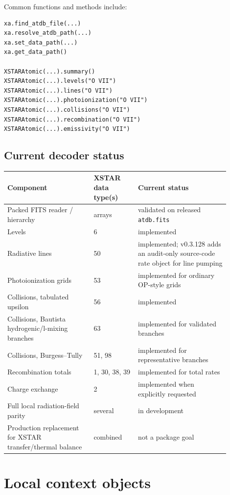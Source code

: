 \documentclass[11pt]{article}
\begin{document}
Common functions and methods include:

\begin{lstlisting}[style=ctpython]
xa.find_atdb_file(...)
xa.resolve_atdb_path(...)
xa.set_data_path(...)
xa.get_data_path()

XSTARAtomic(...).summary()
XSTARAtomic(...).levels("O VII")
XSTARAtomic(...).lines("O VII")
XSTARAtomic(...).photoionization("O VII")
XSTARAtomic(...).collisions("O VII")
XSTARAtomic(...).recombination("O VII")
XSTARAtomic(...).emissivity("O VII")
\end{lstlisting}

\subsection{Current decoder status}

\begin{longtable}{p{0.35\linewidth}p{0.18\linewidth}p{0.37\linewidth}}
\toprule
Component & XSTAR data type(s) & Current status \\
\midrule
Packed FITS reader / hierarchy & arrays & validated on released \texttt{atdb.fits} \\
Levels & 6 & implemented \\
Radiative lines & 50 & implemented; v0.3.128 adds an audit-only source-code rate object for line pumping \\
Photoionization grids & 53 & implemented for ordinary OP-style grids \\
Collisions, tabulated upsilon & 56 & implemented \\
Collisions, Bautista hydrogenic/l-mixing branches & 63 & implemented for validated branches \\
Collisions, Burgess--Tully & 51, 98 & implemented for representative branches \\
Recombination totals & 1, 30, 38, 39 & implemented for total rates \\
Charge exchange & 2 & implemented when explicitly requested \\
Full local radiation-field parity & several & in development \\
Production replacement for XSTAR transfer/thermal balance & combined & not a package goal \\
\bottomrule
\end{longtable}

\section{Local context objects}
\end{document}
